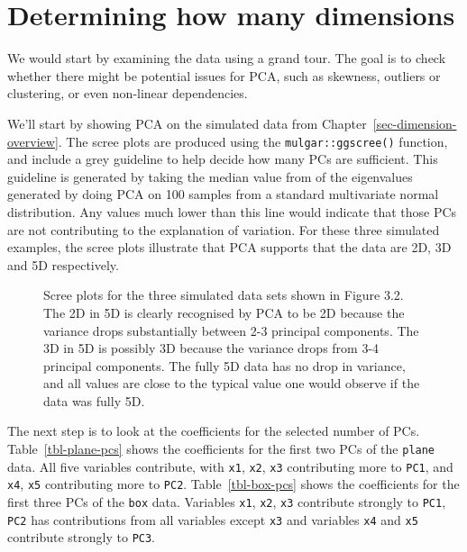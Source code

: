 \documentclass[
  letterpaper,
]{krantz}
\begin{document}
\section{Determining how many
dimensions}\label{determining-how-many-dimensions}

We would start by examining the data using a grand tour. The goal is to
check whether there might be potential issues for PCA, such as skewness,
outliers or clustering, or even non-linear dependencies.

We'll start by showing PCA on the simulated data from
Chapter~\ref{sec-dimension-overview}. The scree plots are produced using
the \texttt{mulgar::ggscree()} function, and include a grey guideline to
help decide how many PCs are sufficient. This guideline is generated by
taking the median value from of the eigenvalues generated by doing PCA
on 100 samples from a standard multivariate normal distribution. Any
values much lower than this line would indicate that those PCs are not
contributing to the explanation of variation. For these three simulated
examples, the scree plots illustrate that PCA supports that the data are
2D, 3D and 5D respectively.


\begin{figure}


\caption{\label{fig-2D-pca}Scree plots for the three simulated data sets
shown in Figure 3.2. The 2D in 5D is clearly recognised by PCA to be 2D
because the variance drops substantially between 2-3 principal
components. The 3D in 5D is possibly 3D because the variance drops from
3-4 principal components. The fully 5D data has no drop in variance, and
all values are close to the typical value one would observe if the data
was fully 5D.}

\end{figure}%

The next step is to look at the coefficients for the selected number of
PCs. Table~\ref{tbl-plane-pcs} shows the coefficients for the first two
PCs of the \texttt{plane} data. All five variables contribute, with
\texttt{x1}, \texttt{x2}, \texttt{x3} contributing more to \texttt{PC1},
and \texttt{x4}, \texttt{x5} contributing more to \texttt{PC2}.
Table~\ref{tbl-box-pcs} shows the coefficients for the first three PCs
of the \texttt{box} data. Variables \texttt{x1}, \texttt{x2},
\texttt{x3} contribute strongly to \texttt{PC1}, \texttt{PC2} has
contributions from all variables except \texttt{x3} and variables
\texttt{x4} and \texttt{x5} contribute strongly to \texttt{PC3}.
\end{document}
